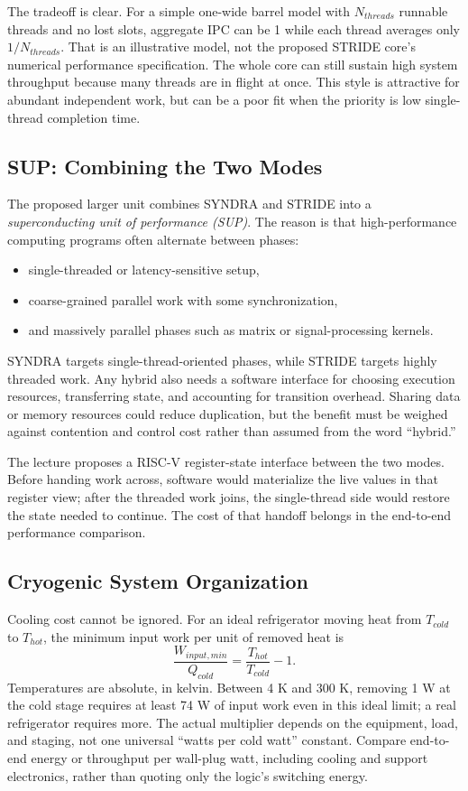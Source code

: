 The tradeoff is clear.
For a simple one-wide barrel model with $N_{threads}$ runnable threads and no lost slots, aggregate IPC can be 1 while each thread averages only $1/N_{threads}$.
That is an illustrative model, not the proposed STRIDE core's numerical performance specification.
The whole core can still sustain high system throughput because many threads are in flight at once.
This style is attractive for abundant independent work, but can be a poor fit when the priority is low single-thread completion time.

\subsection{SUP: Combining the Two Modes}\label{subsec:appd-sup}
The proposed larger unit combines SYNDRA and STRIDE into a \textit{superconducting unit of performance (SUP)}.
The reason is that high-performance computing programs often alternate between phases:
\begin{itemize}
    \item single-threaded or latency-sensitive setup,
    \item coarse-grained parallel work with some synchronization,
    \item and massively parallel phases such as matrix or signal-processing kernels.
\end{itemize}
SYNDRA targets single-thread-oriented phases, while STRIDE targets highly threaded work.
Any hybrid also needs a software interface for choosing execution resources, transferring state, and accounting for transition overhead.
Sharing data or memory resources could reduce duplication, but the benefit must be weighed against contention and control cost rather than assumed from the word ``hybrid.''

The lecture proposes a RISC-V register-state interface between the two modes.
Before handing work across, software would materialize the live values in that register view; after the threaded work joins, the single-thread side would restore the state needed to continue.
The cost of that handoff belongs in the end-to-end performance comparison.

\subsection{Cryogenic System Organization}\label{subsec:appd-cryo}
Cooling cost cannot be ignored.
For an ideal refrigerator moving heat from $T_{cold}$ to $T_{hot}$, the minimum input work per unit of removed heat is
\begin{equation}\label{eq:cryogenic-carnot-bound}
    \frac{W_{input,min}}{Q_{cold}}=\frac{T_{hot}}{T_{cold}}-1.
\end{equation}
Temperatures are absolute, in kelvin.
Between 4 K and 300 K, removing 1 W at the cold stage requires at least 74 W of input work even in this ideal limit; a real refrigerator requires more.
The actual multiplier depends on the equipment, load, and staging, not one universal ``watts per cold watt'' constant.
Compare end-to-end energy or throughput per wall-plug watt, including cooling and support electronics, rather than quoting only the logic's switching energy.

